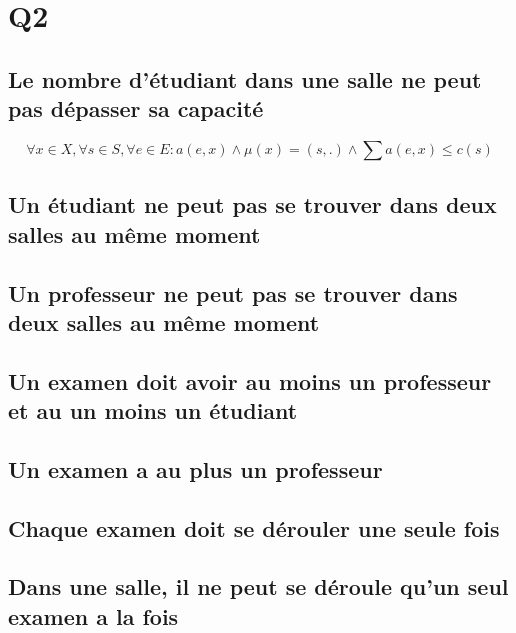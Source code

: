 \documentclass[a4paper,10pt]{article}
\begin{document}
\section{Q2}
\subsection {Le nombre d'étudiant dans une salle ne peut pas dépasser sa capacité}
\begin{displaymath}
\forall x \in X , \forall s \in S ,\forall e \in E : a(e,x) \wedge \mu(x) = (s,.) \wedge \sum a(e,x) \leq c(s)
\end{displaymath}	

\subsection {Un étudiant ne peut pas se trouver dans deux salles au même moment}

\subsection {Un professeur ne peut pas se trouver dans deux salles au même moment}

\subsection {Un examen doit avoir au moins un professeur et au un moins un étudiant}

\subsection {Un examen a au plus un professeur}

\subsection {Chaque examen doit se dérouler une seule fois}

\subsection {Dans une salle, il ne peut se déroule qu'un seul examen a la fois}
\end{document}
